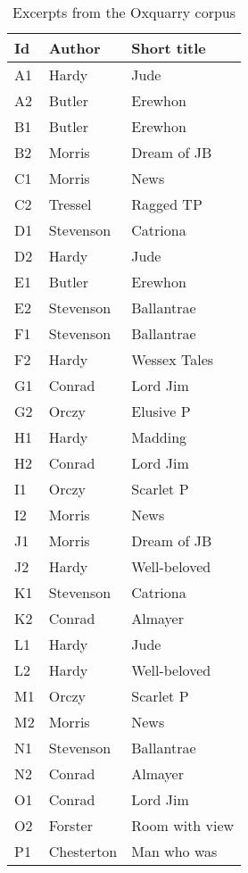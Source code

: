 \twocolumn

\begin{table}[H]
  \small
  \centering
  \caption{Excerpts from the Oxquarry corpus}
  \label{tbl:oxquarry_corpus}

  \begin{tabular}{l l l}
    \toprule
    \textbf{Id} &
    \textbf{Author} &
    \textbf{Short title} \\
    \midrule
    A1 & Hardy & Jude \\
    A2 & Butler & Erewhon \\
    B1 & Butler & Erewhon \\
    B2 & Morris & Dream of JB \\
    C1 & Morris & News \\
    C2 & Tressel & Ragged TP \\
    D1 & Stevenson & Catriona \\
    D2 & Hardy & Jude \\
    E1 & Butler & Erewhon \\
    E2 & Stevenson & Ballantrae \\
    F1 & Stevenson & Ballantrae \\
    F2 & Hardy & Wessex Tales \\
    G1 & Conrad & Lord Jim \\
    G2 & Orczy & Elusive P \\
    H1 & Hardy & Madding \\
    H2 & Conrad & Lord Jim \\
    I1 & Orczy & Scarlet P \\
    I2 & Morris & News \\
    J1 & Morris & Dream of JB \\
    J2 & Hardy & Well-beloved \\
    K1 & Stevenson & Catriona \\
    K2 & Conrad & Almayer \\
    L1 & Hardy & Jude \\
    L2 & Hardy & Well-beloved \\
    M1 & Orczy & Scarlet P \\
    M2 & Morris & News \\
    N1 & Stevenson & Ballantrae \\
    N2 & Conrad & Almayer \\
    O1 & Conrad & Lord Jim \\
    O2 & Forster & Room with view \\
    P1 & Chesterton & Man who was \\

\end{tabular}
\end{table}
